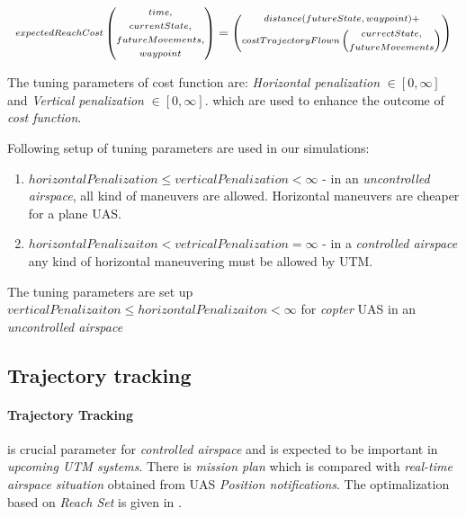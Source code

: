 \begin{equation}\label{eq:costFunctionReachable}
    \scriptsize
    \begin{gathered} expectedReachCost\end{gathered} \left(\begin{gathered}time,\\currentState,\\futureMovements,\\waypoint\end{gathered}\right)
    =
    \left (\begin{gathered}distance(futureState,waypoint)+\\ costTrajectoryFlown\left(\begin{gathered}currectState,\\futureMovements\end{gathered}\right) \end{gathered}\right)
    \normalsize
\end{equation}

\begin{note}
    The tuning parameters of cost function are: \emph{Horizontal penalization} $\in [0,\infty]$ and \emph{Vertical penalization} $\in [0,\infty]$. which are used to enhance the outcome of \emph{cost function}.
    
    Following setup of tuning parameters are used in our simulations:
    \begin{enumerate}
        \item $horizontalPenalization \le verticalPenalization < \infty$ - in an \emph{uncontrolled airspace}, all kind of maneuvers are allowed. Horizontal maneuvers are cheaper for a plane UAS.
        \item $horizontalPenalizaiton < vetricalPenalization = \infty$ - in a \emph{controlled airspace} any kind of horizontal maneuvering must be allowed by UTM.
    \end{enumerate}
    
    The tuning parameters are set up $verticalPenalizaiton \le horizontalPenalizaiton < \infty$ for \emph{copter} UAS in an \emph{uncontrolled airspace}
\end{note}

\subsection{Trajectory tracking}\label{s:trajectoryTracking}
\paragraph{Trajectory Tracking} is crucial parameter for \emph{controlled airspace} and is expected to be important in \emph{upcoming UTM systems}. There is \emph{mission plan} which is compared with \emph{real-time airspace situation} obtained from UAS \emph{Position notifications}. The optimalization based on \emph{Reach Set} is given in \cite{varaiya2000reach}.

